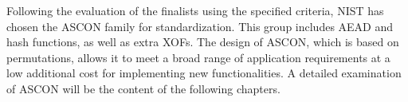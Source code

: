 \documentclass[a4paper,11pt, twoside]{article}
\begin{document}
Following the evaluation of the finalists using the specified criteria, NIST has chosen the ASCON family for standardization. This group includes AEAD and hash functions, as well as extra XOFs. The design of ASCON, which is based on permutations, allows it to meet a broad range of application requirements at a low additional cost for implementing new functionalities. A detailed examination of ASCON will be the content of the following chapters.



\end{document}

